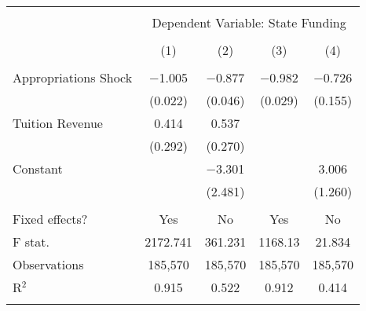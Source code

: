 
\begin{tabular}{@{\extracolsep{5pt}}lcccc} 
\\[-1.8ex]\hline 
\hline \\[-1.8ex] 
 & \multicolumn{4}{c}{Dependent Variable: State Funding} \\ 
\cline{2-5} 
\\[-1.8ex] & (1) & (2) & (3) & (4)\\ 
\hline \\[-1.8ex] 
 Appropriations Shock & $-$1.005 & $-$0.877 & $-$0.982 & $-$0.726 \\ 
  & (0.022) & (0.046) & (0.029) & (0.155) \\ 
  Tuition Revenue & 0.414 & 0.537 &  &  \\ 
  & (0.292) & (0.270) &  &  \\ 
  Constant &  & $-$3.301 &  & 3.006 \\ 
  &  & (2.481) &  & (1.260) \\ 
 \hline \\[-1.8ex] 
Fixed effects? & Yes & No & Yes & No \\ 
F stat. & 2172.741 & 361.231 & 1168.13 & 21.834 \\ 
Observations & 185,570 & 185,570 & 185,570 & 185,570 \\ 
R$^{2}$ & 0.915 & 0.522 & 0.912 & 0.414 \\ 
\hline 
\hline \\[-1.8ex] 
\end{tabular} 
